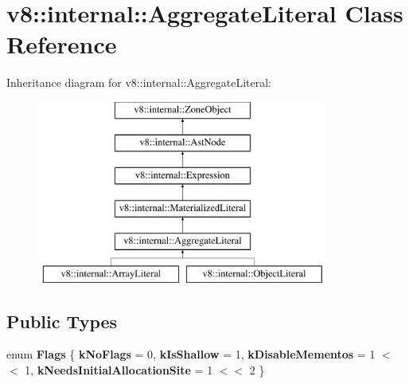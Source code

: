 \hypertarget{classv8_1_1internal_1_1AggregateLiteral}{}\section{v8\+:\+:internal\+:\+:Aggregate\+Literal Class Reference}
\label{classv8_1_1internal_1_1AggregateLiteral}
Inheritance diagram for v8\+:\+:internal\+:\+:Aggregate\+Literal\+:\begin{figure}[H]
\begin{center}
\leavevmode
\includegraphics[height=6.000000cm]{classv8_1_1internal_1_1AggregateLiteral}
\end{center}
\end{figure}
\subsection*{Public Types}
\begin{DoxyCompactItemize}
\item 
\mbox{\label{classv8_1_1internal_1_1AggregateLiteral_a277407153d07ee6a88adf650b71248ad}} 
enum {\bfseries Flags} \{ {\bfseries k\+No\+Flags} = 0, 
{\bfseries k\+Is\+Shallow} = 1, 
{\bfseries k\+Disable\+Mementos} = 1 $<$$<$ 1, 
{\bfseries k\+Needs\+Initial\+Allocation\+Site} = 1 $<$$<$ 2
 \}
\end{DoxyCompactItemize}

